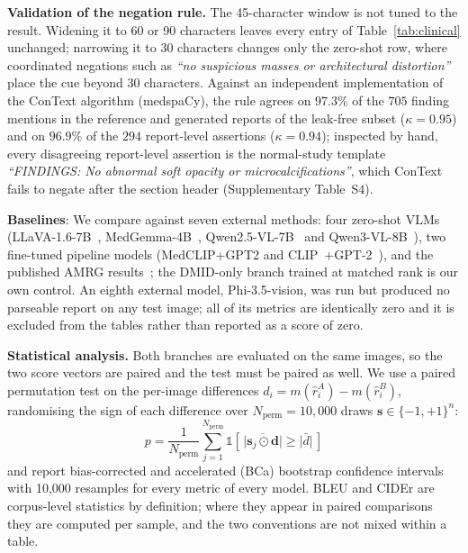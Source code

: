 \documentclass{wlscirep}
\begin{document}
\textbf{Validation of the negation rule.} The 45-character window is not tuned to the result. Widening it to 60 or 90 characters leaves every entry of Table~\ref{tab:clinical} unchanged; narrowing it to 30 characters changes only the zero-shot row, where coordinated negations such as \emph{``no suspicious masses or architectural distortion''} place the cue beyond 30 characters. Against an independent implementation of the ConText algorithm (medspaCy), the rule agrees on $97.3\%$ of the $705$ finding mentions in the reference and generated reports of the leak-free subset ($\kappa = 0.95$) and on $96.9\%$ of the $294$ report-level assertions ($\kappa = 0.94$); inspected by hand, every disagreeing report-level assertion is the normal-study template \emph{``FINDINGS: No abnormal soft opacity or microcalcifications''}, which ConText fails to negate after the section header (Supplementary Table~S4).

\textbf{Baselines}: We compare against seven external methods: four zero-shot VLMs (LLaVA-1.6-7B~\cite{liu2024llava}, MedGemma-4B~\cite{lin2024medgemma}, Qwen2.5-VL-7B~\cite{bai2025qwen25vl} and Qwen3-VL-8B~\cite{bai2025qwen3vl}), two fine-tuned pipeline models (MedCLIP+GPT2 and CLIP~\cite{radford2021clip}+GPT-2~\cite{radford2019gpt2}), and the published AMRG results~\cite{sung2025}; the DMID-only branch trained at matched rank is our own control. An eighth external model, Phi-3.5-vision, was run but produced no parseable report on any test image; all of its metrics are identically zero and it is excluded from the tables rather than reported as a score of zero.

\textbf{Statistical analysis.} Both branches are evaluated on the same images, so the two score vectors are paired and the test must be paired as well. We use a paired permutation test on the per-image differences $d_i = m(\hat{r}_i^{A}) - m(\hat{r}_i^{B})$, randomising the sign of each difference over $N_{\text{perm}} = 10{,}000$ draws $\mathbf{s} \in \{-1,+1\}^{n}$:
\begin{equation}
p = \frac{1}{N_{\text{perm}}} \sum_{j=1}^{N_{\text{perm}}} \mathbb{1}\!\left[\,\bigl|\overline{\mathbf{s}_j \odot \mathbf{d}}\bigr| \geq \bigl|\bar{d}\bigr|\,\right]
\end{equation}
and report bias-corrected and accelerated (BCa) bootstrap confidence intervals with 10{,}000 resamples for every metric of every model. BLEU and CIDEr are corpus-level statistics by definition; where they appear in paired comparisons they are computed per sample, and the two conventions are not mixed within a table.
\end{document}
